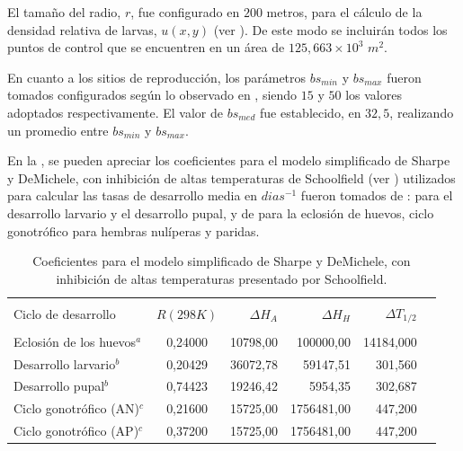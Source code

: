 El tamaño del radio, $r$, fue configurado en $200$ metros, para el cálculo de la densidad relativa
de larvas, $u(x,y)$ (ver ). De este modo se incluirán todos los
puntos de control que se encuentren en un área de $125,663 \times 10^{3}$ $m^{2}$.

En cuanto a los sitios de reproducción, los parámetros $bs_{min}$ y $bs_{max}$ fueron tomados
configurados según lo observado en \cite{otero2006stochastic, otero2008stochastic}, siendo $15$ y
$50$ los valores adoptados respectivamente.  El valor de $bs_{med}$ fue establecido, en $32,5$,
realizando un promedio entre $bs_{min}$ y $bs_{max}$.

En la , se pueden apreciar los coeficientes para el modelo
simplificado de Sharpe y DeMichele, con inhibición de altas temperaturas de Schoolfield (ver
) utilizados para calcular las tasas de desarrollo media
en $dias^{-1}$ fueron tomados de : \cite{rueda1990temperature} para el desarrollo larvario y el
desarrollo pupal, y de \cite{otero2006stochastic} para la eclosión de huevos, ciclo gonotrófico para hembras nulíperas y paridas.

\begin{table}[!htpb]
\begin{minipage}{\textwidth}
    \centering
    \caption{ \label{tab:coef-sharpe-demichele} Coeficientes para el modelo simplificado de Sharpe y DeMichele, con inhibición de altas temperaturas presentado por Schoolfield.}
    \begin{tabular}{p{6cm} c r r r r }
        \hline \\
        Ciclo de desarrollo    & $R(298K)$ & $\Delta H_{A}$ & $\Delta H_{H}$ & $\Delta T_{1/2}$  \\
        \hline
        \hline\\
        Eclosión de los huevos$^a$ & 0,24000 & 10798,00 &  100000,00  & 14184,000\\
        Desarrollo larvario$^b$    & 0,20429 & 36072,78 &   59147,51  &   301,560\\
        Desarrollo pupal$^b$       & 0,74423 & 19246,42 &    5954,35  &   302,687\\
        Ciclo gonotrófico (AN)$^c$ & 0,21600 & 15725,00 & 1756481,00  &   447,200\\
        Ciclo gonotrófico (AP)$^c$ & 0,37200 & 15725,00 & 1756481,00  &   447,200\\
    \end{tabular}
\end{minipage}
\end{table}

